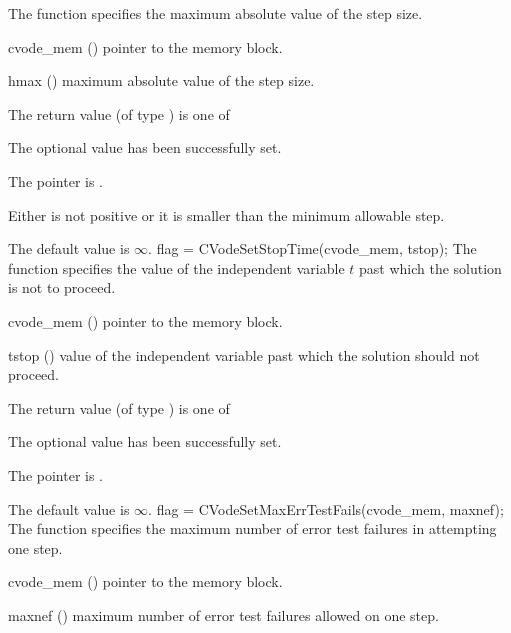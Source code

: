 {
  The function  specifies the maximum absolute
  value of the step size.
}
{
  \begin{args}
  \item[cvode\_mem] ()
    pointer to the {\cvode} memory block.
  \item[hmax] ()
    maximum absolute value of the step size.
  \end{args}
}
{
  The return value  (of type ) is one of
  \begin{args}
  \item[\Id{SUCCESS}] 
    The optional value has been successfully set.
  \item[\Id{CVS\_NO\_MEM}]
    The  pointer is .
  \item[\Id{CVS\_ILL\_INPUT}]
    Either  is not positive or it is smaller than the minimum allowable step.
  \end{args}
}
{
  The default value is $\infty$.
}
{
flag = CVodeSetStopTime(cvode\_mem, tstop);
}
{
  The function  specifies the value of the
  independent variable $t$ past which the solution is not to proceed.
}
{
  \begin{args}
  \item[cvode\_mem] ()
    pointer to the {\cvode} memory block.
  \item[tstop] ()
    value of the independent variable past which the solution should
    not proceed.
  \end{args}
}
{
  The return value  (of type ) is one of
  \begin{args}
  \item[\Id{SUCCESS}] 
    The optional value has been successfully set.
  \item[\Id{CVS\_NO\_MEM}]
    The  pointer is .
  \end{args}
}
{
  The default value is $\infty$.
}
{
flag = CVodeSetMaxErrTestFails(cvode\_mem, maxnef);
}
{
  The function  specifies the
  maximum number of error test failures in attempting one step.
}
{
  \begin{args}
  \item[cvode\_mem] ()
    pointer to the {\cvode} memory block.
  \item[maxnef] ()
    maximum number of error test failures allowed on one step.
  \end{args}
}

